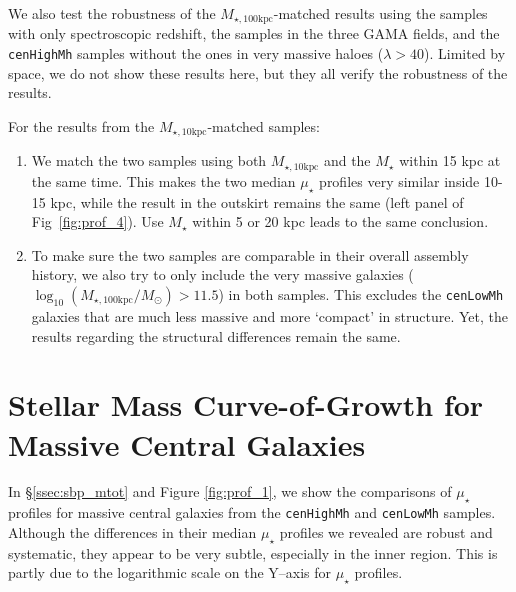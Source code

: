 \documentclass[a4paper,fleqn,usenatbib]{mnras}
\def\rbcg{\texttt{cenHighMh}}
\def\nbcg{\texttt{cenLowMh}}
\def\mstar{{$M_{\star}$}}
\def\minn{{$M_{\star,10\mathrm{kpc}}$}}
\def\mtot{{$M_{\star,100\mathrm{kpc}}$}}
\def\logmtot{{$\log_{10} (M_{\star,100\mathrm{kpc}}/M_{\odot})$}}
\def\mden{{$\mu_{\star}$}}
\begin{document}
    We also test the robustness of the \mtot{}-matched results using the samples with 
    only spectroscopic redshift, the samples in the three GAMA fields, and the \rbcg{} 
    samples without the ones in very massive haloes ($\lambda > 40$).  
    Limited by space, we do not show these results here, but they all verify the 
    robustness of the results. 
    
    For the results from the \minn{}-matched samples: 
    
    \begin{enumerate}
    
        \item
            We match the two samples using both \minn{} and the \mstar{} within 15 kpc 
            at the same time.  
            This makes the two median \mden{} profiles very similar inside 10-15 
            kpc, while the result in the outskirt remains the same (left panel of 
            Fig~\ref{fig:prof_4}).
            Use \mstar{} within 5 or 20 kpc leads to the same conclusion. 
          
        \item 
            To make sure the two samples are comparable in their overall assembly history,
            we also try to only include the very massive galaxies (\logmtot{}$>11.5$)
            in both samples. 
            This excludes the \nbcg{} galaxies that are much less massive and 
            more `compact' in structure. 
            Yet, the results regarding the structural differences remain the same. 
          
    \end{enumerate}

\section{Stellar Mass Curve-of-Growth for Massive Central Galaxies} 
	\label{app:cog}
	
	In \S \ref{ssec:sbp_mtot} and Figure \ref{fig:prof_1}, we show the comparisons 
	of \mden{} profiles for massive central galaxies from the \rbcg{} and \nbcg{} 
	samples. 
	Although the differences in their median \mden{} profiles we revealed are robust 
	and systematic, they appear to be very subtle, especially in the inner region. 
	This is partly due to the logarithmic scale on the Y--axis for \mden{} profiles. 
	
\end{document}
